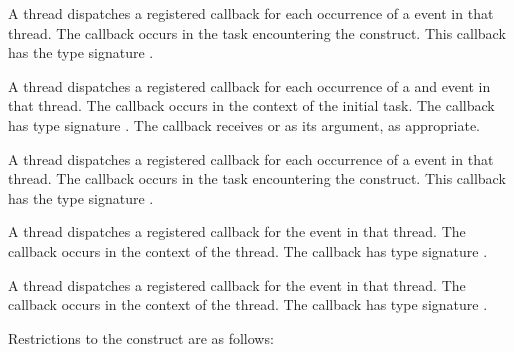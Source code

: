 \tools

A thread dispatches a registered 
callback for each occurrence of a  event in that
thread.  The callback occurs in the task encountering
the  construct.  This callback has the type signature
.

A thread dispatches a registered 
callback for each occurrence of a  and
 event in that thread. The callback occurs in the
context of the initial task.  The callback has type signature
. The callback receives
 or 
as its  argument, as appropriate.

A thread dispatches a registered 
callback for each occurrence of a  event in that
thread.  The callback occurs in the task encountering
the  construct.  This callback has the type signature
.

A thread dispatches a registered 
callback for the  event in that thread.
The callback occurs in the
context of the thread.  The callback has type signature
.

A thread dispatches a registered 
callback for the  event in that thread.
The callback occurs in the context of the thread.  The callback has type signature
.

\restrictions
Restrictions to the  construct are as follows:

